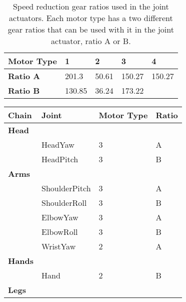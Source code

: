 \begin{table}
\centering
\begin{tabulary}{\textwidth}{|l||l|l|l|l|}
\hline
\textbf{Motor Type} & 1       & 2      & 3       & 4      \\ \hline
\textbf{Ratio A}    & 201.3   & 50.61  & 150.27  & 150.27 \\ \hline
\textbf{Ratio B}    & 130.85  & 36.24  & 173.22  &        \\ \hline
\end{tabulary} 
\caption{Speed reduction gear ratios used in the joint actuators.
         Each motor type has a two different gear ratios that can be used with
         it in the joint actuator, ratio A or B.}
\label{tab:joint_gears}
\end{table}

\begin{table}
\centering
\begin{tabulary}{\textwidth}{|l||l|l|l|}
\hline
\textbf{Chain}  &  \textbf{Joint}  & \textbf{Motor Type}  & \textbf{Ratio}  \\ \hline\hline
\textbf{Head}   &                  &                      &                 \\	\hline
                & HeadYaw          & 3                    & A               \\	\hline
                & HeadPitch        & 3                    & B               \\	\hline
\textbf{Arms}   &                  &                      &                 \\	\hline
                & ShoulderPitch    & 3                    & A               \\	\hline 
                & ShoulderRoll     & 3                    & B               \\	\hline 
                & ElbowYaw         & 3                    & A               \\	\hline 
                & ElbowRoll        & 3                    & B               \\	\hline 
                & WristYaw         & 2                    & A               \\	\hline 
\textbf{Hands}  &                  &                      &                 \\	\hline 
                & Hand             & 2                    & B               \\	\hline 
\textbf{Legs}   &                  &                      &                 \\	\hline

\end{tabulary}
\end{table}
